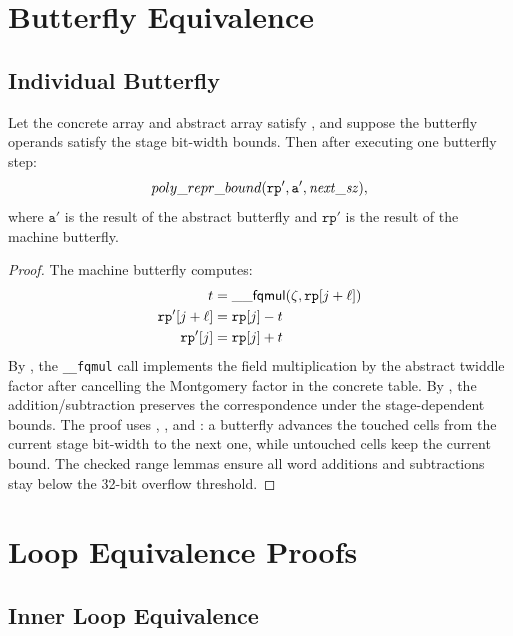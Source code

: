 \section{Butterfly Equivalence}

\subsection{Individual Butterfly}

\begin{lemma}
  Let the concrete array and abstract array satisfy ,
  and suppose the butterfly operands satisfy the stage bit-width bounds.
  Then after executing one butterfly step:
  \[
    poly\_repr\_bound(\texttt{rp}',\texttt{a}',\mathit{next\_sz}),
  \]
  where $\texttt{a}'$ is the result of the abstract butterfly and
  $\texttt{rp}'$ is the result of the machine butterfly.
\label{lem:butterfly_corr}
\end{lemma}

\begin{proof}
  The machine butterfly computes:
  \begin{align*}
    t &= \mathsf{\_\_fqmul}(\zeta,\texttt{rp}[j+\ell]) \\
    \texttt{rp}'[j+\ell] &= \texttt{rp}[j] - t \\
    \texttt{rp}'[j] &= \texttt{rp}[j] + t
  \end{align*}
  By , the \texttt{\_\_fqmul} call implements the
  field multiplication by the abstract twiddle factor after cancelling the
  Montgomery factor in the concrete table.
  By , the addition/subtraction preserves the
  correspondence under the stage-dependent bounds.  The proof uses
  , , and
  : a butterfly advances the touched cells from the
  current stage bit-width to the next one, while untouched cells keep the
  current bound.  The checked range lemmas ensure all word additions and
  subtractions stay below the 32-bit overflow threshold.
\end{proof}

\section{Loop Equivalence Proofs}

\subsection{Inner Loop Equivalence}

